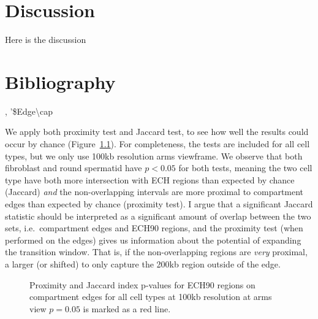 \documentclass[
  11pt,
  a4paper,
]{scrbook}
\let\oldemph\emph
\renewcommand\emph[1]{\oldemph{\color{gray}#1}}
\begin{document}
\chapter{Discussion}\label{discussion}

Here is the discussion

\chapter*{Bibliography}\label{bibliography}

\begingroup
\raggedright

\renewcommand{\bibsection}{}


\endgroup

, '\$Edge\textbackslash cap

We apply both proximity test and Jaccard test, to see how well the
results could occur by chance (Figure~\ref{fig-proximity-jaccard-bar}).
For completeness, the tests are included for all cell types, but we only
use 100kb resolution arms viewframe. We observe that both fibroblast and
round spermatid have \(p < 0.05\) for both tests, meaning the two cell
type have both more intersection with ECH regions than expected by
chance (Jaccard) \emph{and} the non-overlapping intervals are more
proximal to compartment edges than expected by chance (proximity test).
I argue that a significant Jaccard statistic should be interpreted as a
significant amount of overlap between the two sets, i.e.~compartment
edges and ECH90 regions, and the proximity test (when performed on the
edges) gives us information about the potential of expanding the
transition window. That is, if the non-overlapping regions are
\emph{very} proximal, a larger (or shifted) to only capture the 200kb
region outside of the edge.

\begin{figure}[H]


\caption{\label{fig-proximity-jaccard-bar}Proximity and Jaccard index
p-values for ECH90 regions on compartment edges for all cell types at
100kb resolution at arms view \(p=0.05\) is marked as a red line.}

\end{figure}%
\end{document}
